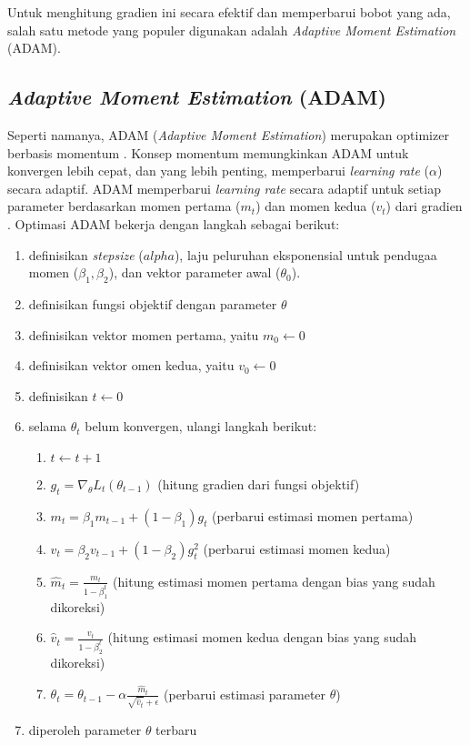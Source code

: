 \documentclass[a4paper,12pt]{report}
\begin{document}
Untuk menghitung gradien ini secara efektif dan memperbarui bobot yang ada, salah satu metode yang populer digunakan adalah \textit{Adaptive Moment Estimation} (ADAM).

\subsection{\textit{Adaptive Moment Estimation} (ADAM)}
Seperti namanya, ADAM (\textit{Adaptive Moment Estimation}) merupakan optimizer berbasis momentum \cite{sethiComprehensiveReviewOptimizers2019}. Konsep momentum memungkinkan ADAM untuk konvergen lebih cepat, dan yang lebih penting, memperbarui \textit{learning rate} ($\alpha$) secara adaptif. ADAM memperbarui \textit{learning rate} secara adaptif untuk setiap parameter berdasarkan momen pertama ($m_t$) dan momen kedua ($v_t$) dari gradien \cite{sethiComprehensiveReviewOptimizers2019}. Optimasi ADAM bekerja dengan langkah sebagai berikut:
\begin{enumerate}
	\item definisikan \textit{stepsize} ($alpha$), laju peluruhan eksponensial untuk pendugaa momen ($\beta_1, \beta_2$), dan vektor parameter awal ($\theta_0$).
	\item definisikan fungsi objektif dengan parameter $\theta$
	\item definisikan vektor momen pertama, yaitu $m_0 \leftarrow 0$ 
	\item definisikan vektor omen kedua, yaitu $v_0 \leftarrow 0$
	\item definisikan $t \leftarrow 0$
	\item selama $\theta_t$ belum konvergen, ulangi langkah berikut:
	\begin{enumerate}
		\item $t \leftarrow t+1$
		\item $g_t = \nabla_\theta L_t(\theta_{t-1})$ (hitung gradien dari fungsi objektif)
		\item $m_t = \beta_1m_{t-1} + (1-\beta_1)g_t$ (perbarui estimasi momen pertama)
		\item $v_t = \beta_2v_{t-1} + (1-\beta_2)g_t^2$ (perbarui estimasi momen kedua)
		\item $\hat{m}_t = \frac{m_t}{1-\beta_1^t}$ (hitung estimasi momen pertama dengan bias yang sudah dikoreksi)
		\item $\hat{v}_t = \frac{v_t}{1-\beta_2^t}$ (hitung estimasi momen kedua dengan bias yang sudah dikoreksi)
		\item $\theta_t = \theta_{t-1} - \alpha \frac{\hat{m}_t}{\sqrt{\hat{v}_t}+\epsilon}$ (perbarui estimasi parameter $\theta$)
	\end{enumerate} 
	\item diperoleh parameter $\theta$ terbaru
\end{enumerate}
\end{document}
